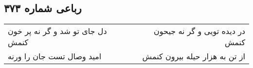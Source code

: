 \begin{center}
\section*{رباعی شماره ۳۷۳}
\label{sec:sh373}
\begin{longtable}{l p{0.5cm} r}
دل جای تو شد و گر نه پر خون کنمش
&&
در دیده تویی و گر نه جیحون کنمش
\\
امید وصال تست جان را ورنه
&&
از تن به هزار حیله بیرون کنمش
\\
\end{longtable}
\end{center}
